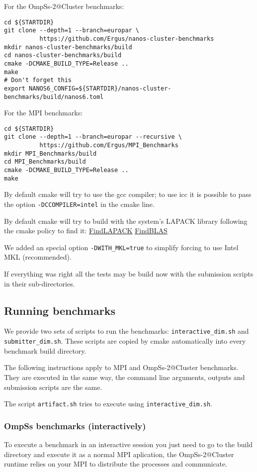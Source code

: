 \documentclass{article}
\newcommand{\code}[1]{\texttt{#1}}
\begin{document}
For the OmpSs-2@Cluster benchmarks:

\begin{lstlisting}
cd ${STARTDIR}
git clone --depth=1 --branch=europar \
          https://github.com/Ergus/nanos-cluster-benchmarks
mkdir nanos-cluster-benchmarks/build
cd nanos-cluster-benchmarks/build
cmake -DCMAKE_BUILD_TYPE=Release ..
make
# Don't forget this
export NANOS6_CONFIG=${STARTDIR}/nanos-cluster-benchmarks/build/nanos6.toml
\end{lstlisting}

For the MPI benchmarks:

\begin{lstlisting}
cd ${STARTDIR}
git clone --depth=1 --branch=europar --recursive \
          https://github.com/Ergus/MPI_Benchmarks
mkdir MPI_Benchmarks/build
cd MPI_Benchmarks/build
cmake -DCMAKE_BUILD_TYPE=Release ..
make
\end{lstlisting}

By default cmake will try to use the gcc compiler; to use icc it is
possible to pass the option \code{-DCCOMPILER=intel} in the cmake
line.

By default cmake will try to build with the system's LAPACK library
following the cmake policy to find it:
\href{https://cmake.org/cmake/help/latest/module/FindLAPACK.html}{FindLAPACK}
\href{https://cmake.org/cmake/help/latest/module/FindBLAS.html}{FindBLAS}

We added an special option \code{-DWITH\_MKL=true} to simplify forcing
to use Intel MKL (recommended).

If everything was right all the tests may be build now with the
submission scripts in their sub-directories.

\subsection{Running benchmarks}

We provide two sets of scripts to run the benchmarks:
\code{interactive\_dim.sh} and \code{submitter\_dim.sh}. These scripts
are copied by cmake automatically into every benchmark build
directory.

The following instructions apply to MPI and OmpSs-2@Cluster
benchmarks.  They are executed in the same way, the command line
arguments, outputs and submission scripts are the same.

The script \code{artifact.sh} tries to execute using
\code{interactive\_dim.sh}.

\subsubsection{OmpSs benchmarks (interactively)}\label{INTERACTIVE}
To execute a benchmark in an interactive session you just need to go
to the build directory and execute it as a normal MPI aplication, the
OmpSs-2@Cluster runtime relies on your MPI to distribute the processes
and communicate.
\end{document}
